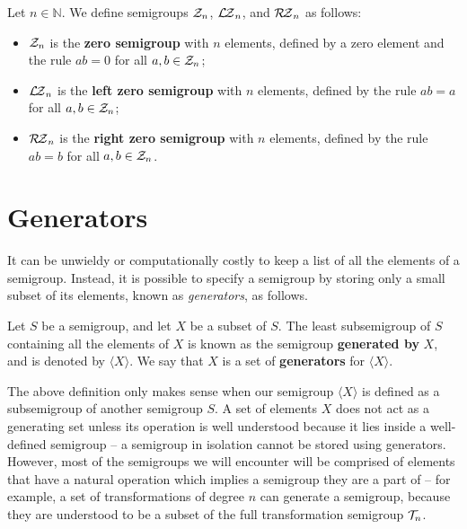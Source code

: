 \begin{definition}
  \label{def:zn}
  Let $n \in \mathbb{N}$.  We define semigroups $\mathcal{Z}_n$, $\mathcal{L\!Z}_n$, and $\mathcal{R\!Z}_n$ as
  follows:
  \begin{itemize}
  \item $\mathcal{Z}_n$ is the \textbf{zero semigroup} with $n$ elements, defined by a
    zero element and the rule $ab=0$ for all $a,b \in \mathcal{Z}_n$;
  \item $\mathcal{L\!Z}_n$ is the \textbf{left zero semigroup} with $n$ elements, defined
    by the rule $ab=a$ for all $a,b \in \mathcal{Z}_n$;
  \item $\mathcal{R\!Z}_n$ is the \textbf{right zero semigroup} with $n$ elements, defined
    by the rule $ab=b$ for all $a,b \in \mathcal{Z}_n$.
  \end{itemize}
\end{definition}

\section{Generators}
\label{sec:intro-generators}

It can be unwieldy or computationally costly to keep a list of all the elements
of a semigroup.  Instead, it is possible to specify a semigroup by storing only
a small subset of its elements, known as \textit{generators}, as follows.

\begin{definition}
  \label{def:generator}
  Let $S$ be a semigroup, and let $X$ be a subset of $S$.  The least
  subsemigroup of $S$ containing all the elements of $X$ is known as the
  semigroup \textbf{generated by} $X$, and is denoted by $\langle X \rangle$.
  We say that $X$ is a set of \textbf{generators} for $\langle X \rangle$.
\end{definition}

The above definition only makes sense when our semigroup $\langle X \rangle$ is
defined as a subsemigroup of another semigroup $S$.  A set of elements $X$ does
not act as a generating set unless its operation is well understood because it
lies inside a well-defined semigroup -- a semigroup in isolation cannot be
stored using generators.  However, most of the semigroups we will encounter will
be comprised of elements that have a natural operation which implies a semigroup
they are a part of -- for example, a set of transformations of degree $n$ can
generate a semigroup, because they are understood to be a subset of the full
transformation semigroup $\mathcal{T}_n$.

